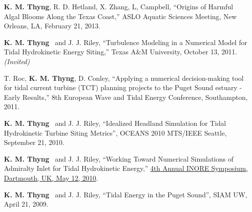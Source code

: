 \documentclass[10pt,letterpaper]{article}
\newcommand{\kmt}{\textbf{K. M. Thyng}}
\renewenvironment{itemize}{
  \begin{list}{}{
    \setlength{\leftmargin}{1.5em}
    \setlength{\itemsep}{0.25em}
    \setlength{\parskip}{0pt}
    \setlength{\parsep}{0.25em}
  }
}{
  \end{list}
}
\begin{document}
\begin{itemize}
\item \kmt, R. D. Hetland, X. Zhang, L, Campbell, ``Origins of Harmful Algal Blooms Along the Texas Coast,'' ASLO Aquatic Sciences Meeting, New Orleans, LA, February 21, 2013.

\item \kmt~ and J. J. Riley, ``Turbulence Modeling in a Numerical Model for Tidal Hydrokinetic Energy Siting,'' Texas A\&M University, October 13, 2011. \textit{(Invited)}

\item T. Roc, \kmt, D. Conley, ``Applying a numerical decision-making tool for tidal current turbine (TCT) planning projects to the Puget Sound estuary - Early Results,'' 8th European Wave and Tidal Energy Conference, Southampton, 2011.





\item \kmt~ and J. J. Riley, ``Idealized Headland Simulation for Tidal Hydrokinetic Turbine Siting Metrics'', OCEANS 2010 MTS/IEEE Seattle, September 21, 2010.

\item \kmt~ and J. J. Riley, ``Working Toward Numerical Simulations of Admiralty Inlet for Tidal Hydrokinetic Energy,'' \href{http://inore.org/}{4th Annual INORE Symposium, Dartmouth, UK, May 12, 2010}.

\item \kmt~ and J. J. Riley, ``Tidal Energy in the Puget Sound'', SIAM UW, April 21, 2009.


\end{itemize}
\end{document}
